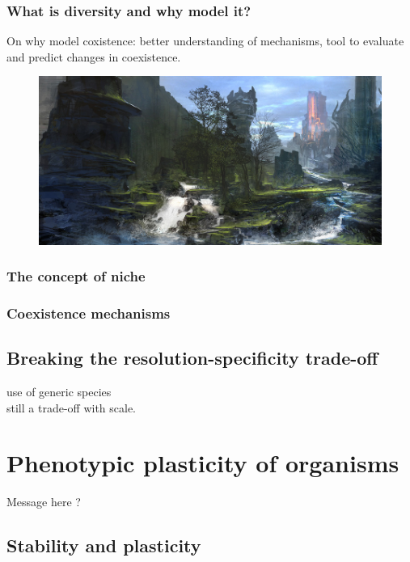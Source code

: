 \subsection{What is diversity and why model it?}

On why model coxistence: better understanding of mechanisms, tool to evaluate and predict changes in coexistence.

\begin{figure}
\includegraphics[scale=1]{./1_Introduction/graphics/plankton.jpg}
\end{figure}

\subsection{The concept of niche}


\subsection{Coexistence mechanisms}

\section{Breaking the resolution-specificity trade-off}
use of generic species\\
still a trade-off with scale.

\chapter{Phenotypic plasticity of organisms}
Message here ?

\section{Stability and plasticity}

